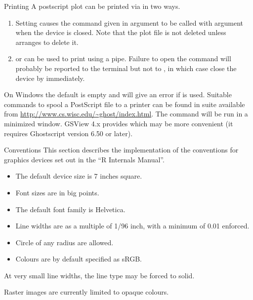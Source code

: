 %
\begin{Section}{Printing}
A postscript plot can be printed via  in two ways.
\begin{enumerate}

\item Setting  causes the command given in
argument  to be called with argument 
when the device is closed.  Note that the plot file is not deleted
unless  arranges to delete it.

\item {} or  can be used to print
using a pipe.  Failure to open the command will probably be reported
to the terminal but not to \R{}, in which case close the
device by  immediately.

\end{enumerate}

On Windows the default
 is empty and will give an error if
 is used.  Suitable commands to spool a PostScript
file to a printer can be found in  suite available from
\url{http://www.cs.wisc.edu/~ghost/index.html}.  The command will be
run in a minimized window.   GSView 4.x provides 
which may be more convenient (it requires Ghostscript version 6.50
or later).
\end{Section}
%
\begin{Section}{Conventions}
This section describes the implementation of the conventions for
graphics devices set out in the ``R Internals Manual''.

\begin{itemize}

\item The default device size is 7 inches square.
\item Font sizes are in big points.
\item The default font family is Helvetica.
\item Line widths are as a multiple of 1/96 inch, with a minimum
of 0.01 enforced.   
\item Circle of any radius are allowed.
\item Colours are by default specified as sRGB.

\end{itemize}


At very small line widths, the line type may be forced to solid.

Raster images are currently limited to opaque colours.
\end{Section}
